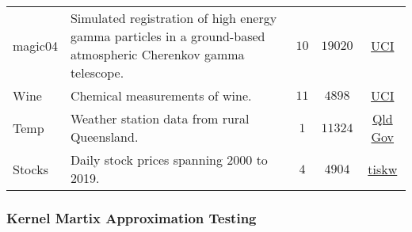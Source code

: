 \begin{longtable}{lp{}ccc}
    magic04                                                                  & Simulated registration of high energy
    gamma particles in a ground-based atmospheric Cherenkov gamma telescope. & $10$                                                                                                                                                                                 & $19020$ & \href{https://archive.ics.uci.edu/ml/datasets/magic+gamma+telescope}{UCI}                                                                                                                                 \\
    Wine                                                                     & Chemical measurements of wine.                                                                                                                                                       & $11$    & $4898$                                                                    & \href{https://archive.ics.uci.edu/ml/datasets/Wine+Quality}{UCI}                                                              \\
    Temp                                                                     & Weather station data from rural Queensland.                                                                                                                                          & $1$     & $11324$                                                                   & \href{https://www.longpaddock.qld.gov.au/}{Qld Gov}                                                                           \\
    Stocks                                                                   & Daily stock prices spanning 2000 to 2019.                                                                                                                                            & $4$     & $4904$                                                                    & \href{https://github.com/tiskw/random-fourier-features/blob/main/dataset/stockprice/download_stockprice_zipped_csv.py}{tiskw}
    \\\bottomrule
    \hline
\end{longtable}

\subsubsection{Kernel Martix Approximation Testing}\label{Section5.2.1}

